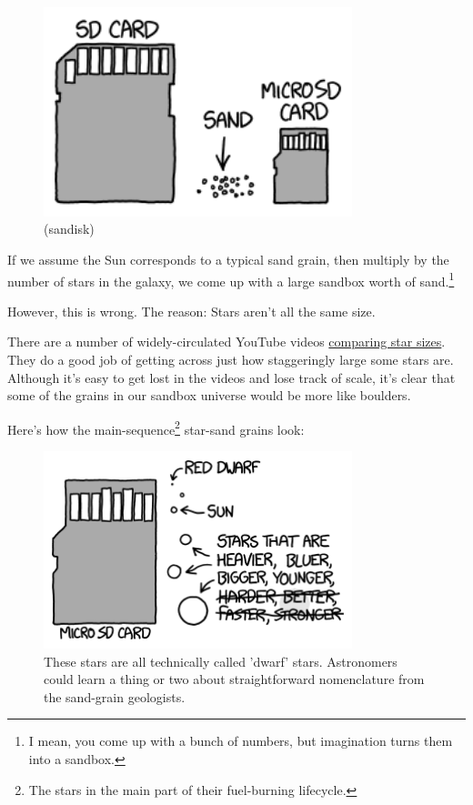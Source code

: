 {\begin{figure}[!htbp]
\centering
\includegraphics[scale=0.5, max width=0.8\textwidth]{imgs/a/83/sand_sd.png}
\caption{(sandisk)}
\end{figure}

{If we assume the Sun corresponds to a typical sand grain, then multiply by the number of stars in the galaxy, we come up with a large sandbox worth of sand.{\footnote{I mean, you come up with a bunch of numbers, but imagination turns them into a sandbox.} } }

{However, this is wrong. The reason: Stars aren't all the same size.}

{There are a number of widely-circulated YouTube videos \href{https://www.youtube.com/results?search\_query=star\%20sizes}{comparing star sizes}. They do a good job of getting across just how staggeringly large some stars are. Although it's easy to get lost in the videos and lose track of scale, it's clear that some of the grains in our sandbox universe would be more like boulders.}

{Here's how the main-sequence{\footnote{The stars in the main part of their fuel-burning lifecycle.} } star-sand grains look:}

\begin{figure}[!htbp]
\centering
\includegraphics[scale=0.5, max width=0.8\textwidth]{imgs/a/83/sand_dwarfs.png}
\caption{These stars are all technically called 'dwarf' stars. Astronomers could learn a thing or two about straightforward nomenclature from the sand-grain geologists.}
\end{figure}

}
